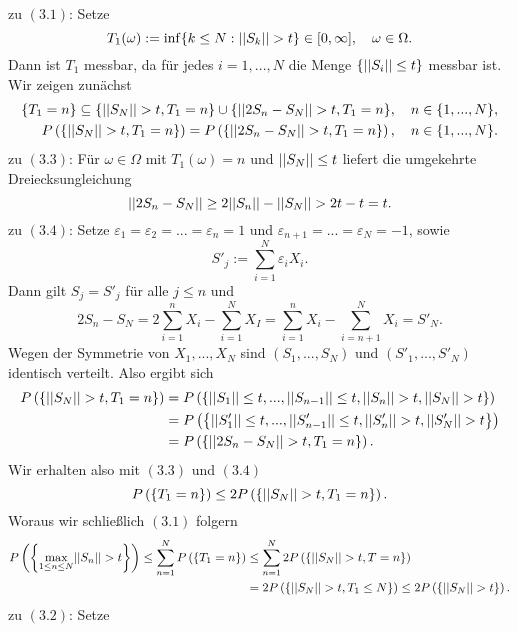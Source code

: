 \begin{proof*}
    zu $(3.1)$:
    Setze 
    $$
        T_1(\omega) := \inf\{ k \leq N: \lvert\lvert S_k \rvert\rvert > t \} \in [0, \infty], \quad \omega \in \Omega. 
    $$
    Dann ist $T_1$ messbar, da für jedes $i =1,...,N$ die Menge $\{ \lvert\lvert S_i \rvert\rvert \leq t\}$ messbar ist. 
    Wir zeigen zunächst
    \begin{align}
        \{T_1 = n\} \subseteq \{\lvert\lvert S_N \rvert\rvert > t, T_1 = n\} \cup \{\lvert\lvert 2S_n - S_N \rvert\rvert>t, T_1=n\}, \quad n \in \{1,...,N\}, \\\
        P\left(\left\{ \lvert\lvert S_N \rvert\rvert > t, T_1=n \right\}\right) = P\left(\left\{ \lvert\lvert 2S_n - S_N \rvert\rvert > t, T_1=n \right\}\right), \quad n \in \{1,...,N\}. 
    \end{align}
    zu $(3.3)$:
    Für $\omega \in \Omega$ mit $T_1(\omega) = n$ und $\lvert\lvert S_N \rvert\rvert \leq t$ liefert die umgekehrte Dreiecksungleichung
    $$
        \lvert\lvert 2S_n - S_N \rvert\rvert \geq 2\lvert\lvert S_n \rvert\rvert - \lvert\lvert S_N \rvert\rvert > 2t - t = t. 
    $$
    zu $(3.4)$: Setze $\varepsilon_1 = \varepsilon_2 = ... = \varepsilon_n = 1$ und $\varepsilon_{n+1} = ... = \varepsilon_N = -1$, sowie
    $$
        S'_j := \sum_{i=1}^N\varepsilon_i X_i. 
    $$
    Dann gilt $S_j = S'_j$ für alle $j \leq n$ und 
    $$
        2S_n - S_N = 2 \sum_{i=1}^n X_i - \sum_{i=1}^N X_I = \sum_{i=1}^nX_i - \sum_{i=n+1}^N X_i = S'_N. 
    $$
    Wegen der Symmetrie von $X_1,...,X_N$ sind $(S_1,...,S_N)$ und $(S'_1,...,S'_N)$ identisch verteilt. Also ergibt sich 
    \begin{align*}
        P\left(\left\{ \lvert\lvert S_N \rvert\rvert > t, T_1=n \right\}\right) &= P\left(\left\{ \lvert\lvert S_1 \rvert\rvert \leq t,...,\lvert\lvert S_{n-1} \rvert\rvert\leq t, \lvert\lvert S_n \rvert\rvert > t, \lvert\lvert S_N \rvert\rvert > t \right\}\right) \\\
                                   &= P\left(\left\{ \lvert\lvert S'_1 \rvert\rvert\leq t,...,\lvert\lvert S'_{n-1} \rvert\rvert\leq t, \lvert\lvert S'_n \rvert\rvert > t, \lvert\lvert S'_N \rvert\rvert > t \right\}\right) \\\
                                   &= P\left(\left\{ \lvert\lvert 2S_n - S_N \rvert\rvert > t, T_1=n \right\}\right). 
    \end{align*}
    Wir erhalten also mit $(3.3)$ und $(3.4)$ 
    $$
        P\left(\left\{ T_1=n \right\}\right) \leq 2 P\left(\left\{ \lvert\lvert S_N \rvert\rvert > t, T_1=n \right\}\right).
    $$
    Woraus wir schließlich $(3.1)$ folgern  
    \begin{align*}
        P\left(\left\{ \max_{1 \leq n \leq N} \lvert\lvert S_n \rvert\rvert > t \right\}\right) \leq \sum_{n=1}^{N} P\left(\left\{ T_1=n \right\}\right) 
                                                     &\leq \sum_{n=1}^N2P\left(\left\{ \lvert\lvert S_N \rvert\rvert >t, T=n \right\}\right) \\\
                                                     &= 2 P\left(\left\{ \lvert\lvert S_N \rvert\rvert>t, T_1 \leq N \right\}\right) \leq 2 P\left(\left\{ \lvert\lvert S_N \rvert\rvert > t \right\}\right). 
    \end{align*}
    zu $(3.2)$: 
    Setze 

\end{proof*}
